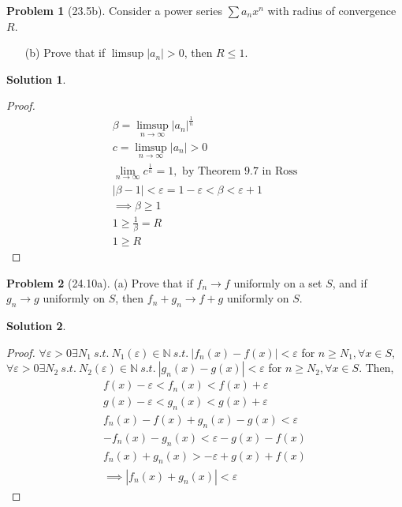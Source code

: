 \documentclass[12pt]{article}
\theoremstyle{definition} %
\newtheorem{solution}{Solution}
\newtheorem{problem}{Problem}
\theoremstyle{plain} %
\begin{document}
\begin{problem}[23.5b]
    Consider a power series $ \sum a_n x^n $ with radius of convergence $ R $.
\begin{enumerate}
    \item[(b)] Prove that if $ \limsup |a_n| > 0 $, then $ R \leq 1 $.
\end{enumerate}
\end{problem}
\begin{solution}
\begin{proof}
    \begin{align}
    \beta = \limsup_{n \to \infty} \left\vert a_{n} \right\vert^{\frac{1}{n}}\\[10pt] 
    c = \limsup_{n \to \infty} \left\vert a_{n} \right\vert>0\\[10pt] 
    \lim_{n \to \infty}c^{\frac{1}{n}} = 1, \text{ by Theorem 9.7 in Ross} \\[10pt] 
    \left\vert \beta-1 \right\vert <\varepsilon= 1-\varepsilon < \beta <\varepsilon+1 \\[10pt] 
    \implies \beta\geq 1\\[10pt] 
    1\geq \frac{1}{\beta}=R \\[10pt] 
    1\geq R
\end{align}
\end{proof} 
\end{solution}
\begin{problem}[24.10a]
    (a) Prove that if $ f_n \to f $ uniformly on a set $ S $, and if $ g_n \to g $ uniformly on $ S $, then $ f_n + g_n \to f + g $ uniformly on $ S $.
\end{problem}
\begin{solution}
    \begin{proof}
        $\forall \varepsilon>0 \exists N_1 \ s.t. \ N_1(\varepsilon)\in \mathbb{N} \ s.t. \ \left\vert f_n(x)-f(x) \right\vert<\varepsilon $ for $n\geq N_1, \forall x\in S$, 
    $\forall \varepsilon>0 \exists N_2 \ s.t. \ N_2(\varepsilon)\in \mathbb{N} \ s.t. \ \left\vert g_n(x)-g(x) \right\vert<\varepsilon $ for $n\geq N_2, \forall x\in S$. Then,
    \begin{align}
        f(x)-\varepsilon<f_{n}(x)<f(x)+\varepsilon \\[10pt] 
        g(x)-\varepsilon<g_{n}(x)<g(x)+\varepsilon \\[10pt]
        f_{n}(x)-f(x)+g_{n}(x)-g(x)<\varepsilon \\[10pt] 
        -f_{n}(x)-g_{n}(x)<\varepsilon-g(x)-f(x) \\[10pt] 
        f_{n}(x)+g_{n}(x)>-\varepsilon+g(x)+f(x) \\[10pt] 
        \implies \left\vert f_{n}(x)+g_{n}(x) \right\vert <\varepsilon
    \end{align}
    \end{proof}
\end{solution}
\end{document}
